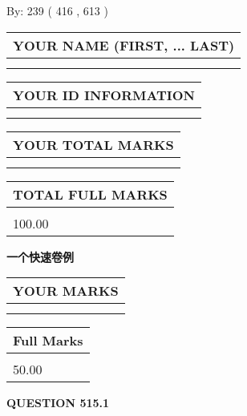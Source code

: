\documentclass{ctexart}
\begin{document}
   
\hspace{1.0in} By: 
 239 ( 416 ,  613 )
   
   
   
   
\newpage 
\setcounter{page}{ 
   515001 } 
   
   
   
   
\noindent\begin{tabular}{|l|}
\hline
YOUR NAME (FIRST, ... LAST)  \\
\hline
 \\ 
 \\ 
\hline
\end{tabular}
\hspace{0.05in} \begin{tabular}{|l|}
\hline
 YOUR   ID   INFORMATION  \\
\hline
 \\ 
 \\ 
\hline
\end{tabular}
   
   
\vspace{0.2in}\noindent\begin{tabular}{|l|}
\hline
YOUR TOTAL MARKS  \\
\hline
 \\ 
 \\ 
\hline
\end{tabular}
\hspace{0.05in} \begin{tabular}{|l|}
\hline
TOTAL FULL MARKS  \\
\hline
 \\ 
100.00 \\
\hline
\end{tabular}
   
   
 \vspace{0.2in}
{\LARGE {\textbf{ 一个快速卷例}}}
   
   
  
\vspace{0.2in}
  
\noindent\begin{tabular}{|l|}
\hline
 YOUR MARKS  \\
\hline
 \\ 
 \\ 
\hline
\end{tabular}
\hspace{0.05in} \begin{tabular}{|l|}
\hline
 Full Marks  \\
\hline
 \\ 
50.00 \\
\hline
\end{tabular}
{\textbf{\Large{QUESTION
515.1 
}}}
  
\end{document}

